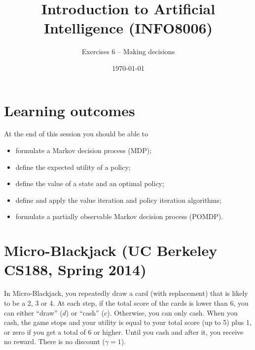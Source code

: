 \documentclass[11pt, a4paper]{article}
\title{Introduction to Artificial Intelligence (INFO8006)}
\subtitle{Exercises 6 -- Making decisions}
\date{\today}
\begin{document}
\maketitle

\section*{Learning outcomes}

At the end of this session you should be able to
\begin{itemize}[noitemsep]
    \item formulate a Markov decision process (MDP);
    \item define the expected utility of a policy;
    \item define the value of a state and an optimal policy;
    \item define and apply the value iteration and policy iteration algorithms;
    \item formulate a partially observable Markov decision process (POMDP).
\end{itemize}

\section{Micro-Blackjack (UC Berkeley CS188, Spring 2014)}

In Micro-Blackjack, you repeatedly draw a card (with replacement) that is likely to be a 2, 3 or 4. At each step, if the total score of the cards is lower than 6, you can either \enquote{draw} ($d$) or \enquote{cash} ($c$). Otherwise, you can only cash. When you cash, the game stops and your utility is equal to your total score (up to 5) plus 1, or zero if you get a total of 6 or higher. Until you cash and after it, you receive no reward. There is no discount ($\gamma = 1$).
\end{document}

